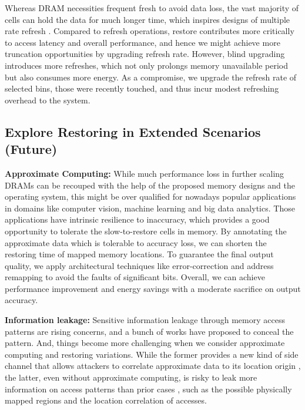 Whereas DRAM necessities frequent fresh to avoid data loss, the vast majority of cells can hold the data for much longer time, which inspires designs of multiple rate refresh \cite{EDL09:ret, ISCA12:raidr, ISCA15:reflex}.
Compared to refresh operations, restore contributes more critically to access latency and overall performance, and hence we might achieve more truncation opportunities by upgrading refresh rate. 
However, blind upgrading introduces more refreshes, which not only prolongs memory unavailable period but also consumes more energy.
As a compromise, we upgrade the refresh rate of selected bins, those were recently touched, and thus incur modest refreshing overhead to the system.

\subsection{Explore Restoring in Extended Scenarios (Future)}

\textbf{Approximate Computing:} While much performance loss in further scaling DRAMs can be recouped with the help of the proposed memory designs and the operating system, this might be over qualified for nowadays popular applications in domains like computer vision, machine learning and big data analytics.
Those applications have intrinsic resilience to inaccuracy, which
provides a good opportunity to tolerate the slow-to-restore cells in memory. By annotating the approximate data \cite{PLDI11:enerj, MICRO13:appro, MICRO14:appro, MICRO15:doppelganger} which is tolerable to accuracy loss, we can shorten the restoring time of mapped memory locations. To guarantee the final output quality, we apply architectural techniques like error-correction and address remapping to avoid the faults of significant bits. Overall, we can achieve performance improvement and energy savings with a moderate sacrifice on output accuracy.

\textbf{Information leakage:} 
Sensitive information leakage through memory access patterns are rising concerns, and a bunch of works \cite{CCS13:oram, HPCA14:channel, MICRO15:fs} have proposed to conceal the pattern.
And, things become more challenging when we consider approximate computing and restoring variations. While the former provides a new kind of side channel that allows attackers to correlate approximate data to its location origin \cite{ISCA15:prob}, the latter, even without approximate computing, is risky to leak more information on access patterns than prior cases \cite{HPCA14:channel, MICRO15:fs}, such as the possible physically mapped regions and the location correlation of accesses.

